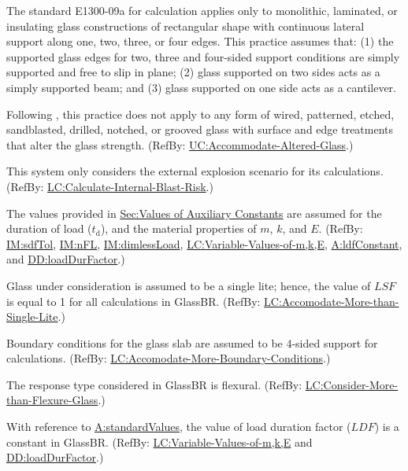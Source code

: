 \documentclass[12pt]{article}
\begin{document}
\begin{description}[font=\normalfont]
\item[glassType:\phantomsection\label{assumpGT}]{The standard E1300-09a for calculation applies only to monolithic, laminated, or insulating glass constructions of rectangular shape with continuous lateral support along one, two, three, or four edges. This practice assumes that: (1) the supported glass edges for two, three and four-sided support conditions are simply supported and free to slip in plane; (2) glass supported on two sides acts as a simply supported beam; and (3) glass supported on one side acts as a cantilever.}
\item[glassCondition:\phantomsection\label{assumpGC}]{Following \cite[(pg. 1)]{astm2009}, this practice does not apply to any form of wired, patterned, etched, sandblasted, drilled, notched, or grooved glass with surface and edge treatments that alter the glass strength. (RefBy: \hyperref[accAlteredGlass]{UC:Accommodate-Altered-Glass}.)}
\item[explainScenario:\phantomsection\label{assumpES}]{This system only considers the external explosion scenario for its calculations. (RefBy: \hyperref[calcInternalBlastRisk]{LC:Calculate-Internal-Blast-Risk}.)}
\item[standardValues:\phantomsection\label{assumpSV}]{The values provided in \hyperref[Sec:AuxConstants]{Sec:Values of Auxiliary Constants} are assumed for the duration of load (${t_{\text{d}}}$), and the material properties of $m$, $k$, and $E$. (RefBy: \hyperref[IM:sdfTol]{IM:sdfTol}, \hyperref[IM:nFL]{IM:nFL}, \hyperref[IM:dimlessLoad]{IM:dimlessLoad}, \hyperref[varValsOfmkE]{LC:Variable-Values-of-m,k,E}, \hyperref[assumpLDFC]{A:ldfConstant}, and \hyperref[DD:loadDurFactor]{DD:loadDurFactor}.)}
\item[glassLite:\phantomsection\label{assumpGL}]{Glass under consideration is assumed to be a single lite; hence, the value of $\mathit{LSF}$ is equal to 1 for all calculations in GlassBR. (RefBy: \hyperref[accMoreThanSingleLite]{LC:Accomodate-More-than-Single-Lite}.)}
\item[boundaryConditions:\phantomsection\label{assumpBC}]{Boundary conditions for the glass slab are assumed to be 4-sided support for calculations. (RefBy: \hyperref[accMoreBoundaryConditions]{LC:Accomodate-More-Boundary-Conditions}.)}
\item[responseType:\phantomsection\label{assumpRT}]{The response type considered in GlassBR is flexural. (RefBy: \hyperref[considerMoreThanFlexGlass]{LC:Consider-More-than-Flexure-Glass}.)}
\item[ldfConstant:\phantomsection\label{assumpLDFC}]{With reference to \hyperref[assumpSV]{A:standardValues}, the value of load duration factor ($\mathit{LDF}$) is a constant in GlassBR. (RefBy: \hyperref[varValsOfmkE]{LC:Variable-Values-of-m,k,E} and \hyperref[DD:loadDurFactor]{DD:loadDurFactor}.)}
\end{description}
\end{document}
